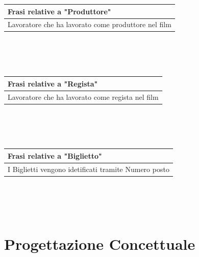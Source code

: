 \documentclass[10pt]{article}
\begin{document}
	\begin{tabular} { |p{16.8cm}| }
		\hline
		\rowcolor{lightgray}
		\textbf{Frasi relative a "Produttore"} \\
		\hline
		Lavoratore che ha lavorato come produttore nel film \\
		\hline 		
	\end{tabular} 
	\\\\\\
	\begin{tabular} { |p{16.8cm}| }
		\hline
		\rowcolor{lightgray}
		\textbf{Frasi relative a "Regista"} \\
		\hline
		Lavoratore che ha lavorato come regista nel film \\
		\hline 		
	\end{tabular} 
	\\\\\\
	\begin{tabular} { |p{16.8cm}| }
		\hline
		\rowcolor{lightgray}
		\textbf{Frasi relative a "Biglietto"} \\
		\hline
		I Biglietti vengono idetificati tramite Numero posto \\
		\hline 		
	\end{tabular} 
	\\\\\\
	
	
	\section{Progettazione Concettuale}	
\end{document}
